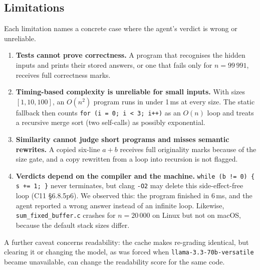\documentclass[11pt,a4paper]{article}
\newcommand{\file}[1]{\nolinkurl{#1}}
\begin{document}
\subsection{Limitations}
Each limitation names a concrete case where the agent's verdict is wrong or unreliable.
\begin{enumerate}
  \item \textbf{Tests cannot prove correctness.} A program that recognises the hidden inputs and prints their stored
        answers, or one that fails only for $n = 99\,991$, receives full correctness marks.
  \item \textbf{Timing-based complexity is unreliable for small inputs.} With sizes $[1, 10, 100]$, an $O(n^2)$ program runs
        in under 1\,ms at every size. The static fallback then counts \texttt{for (i = 0; i < 3; i++)} as an $O(n)$ loop and
        treats a recursive merge sort (two self-calls) as possibly exponential.
  \item \textbf{Similarity cannot judge short programs and misses semantic rewrites.} A copied six-line $a+b$ receives
        full originality marks because of the size gate, and a copy rewritten from a loop into recursion is not flagged.
  \item \textbf{Verdicts depend on the compiler and the machine.} \texttt{while (b != 0) \{ s += 1; \}} never terminates,
        but clang \texttt{-O2} may delete this side-effect-free loop (C11 \S6.8.5p6). We observed this: the program finished
        in 6\,ms, and the agent reported a wrong answer instead of an infinite loop. Likewise, \file{sum_fixed_buffer.c}
        crashes for $n = 20\,000$ on Linux but not on macOS, because the default stack sizes differ.
\end{enumerate}
A further caveat concerns readability: the cache makes re-grading identical, but clearing it or changing the model, as was forced when \texttt{llama-3.3-70b-versatile} became unavailable, can change the readability score for the same code.

\end{document}
